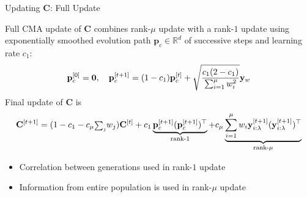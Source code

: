 \documentclass[11pt,compress,t,notes=noshow, xcolor=table]{beamer}
\begin{document}
%
%

\begin{vbframe}{Updating $\mathbf{C}$: Full Update}

Full CMA update of $\mathbf{C}$ combines rank-$\mu$ update with a rank-$1$ update using exponentially smoothed evolution path $\mathbf{p}_c \in \mathbb{R}^{d}$ of successive steps and learning rate $c_1$:
$$\mathbf{p}_{c}^{[0]}=\bm{0}, \quad \mathbf{p}_{c}^{[t+1]} = (1-c_1)\mathbf{p}_{c}^{[t]} + \sqrt{\frac{c_1(2-c_1)}{\sum_{i=1}^{\mu}w_i^2}}\mathbf{y}_w$$
Final update of $\mathbf{C}$ is
$$\mathbf{C}^{[t+1]}=(1-c_1-c_{\mu}{\scriptstyle\sum_j} w_j)\mathbf{C}^{[t]}+c_1 \underbrace{\mathbf{p}_{c}^{[t+1]}(\mathbf{p}_{c}^{[t+1]})^{\top}}_{\text{rank-$1$}}+c_{\mu}\underbrace{\sum_{i=1}^{\mu}w_i \mathbf{y}_{i:\lambda}^{[t+1]}(\mathbf{y}_{i:\lambda}^{[t+1]})^{\top}}_{\text{rank-$\mu$}}$$
\vspace{-0.4cm}
\begin{itemize}
    \item Correlation between generations used in rank-$1$ update
    \item Information from entire population is used in rank-$\mu$ update
\end{itemize}

\end{vbframe}

\end{document}

